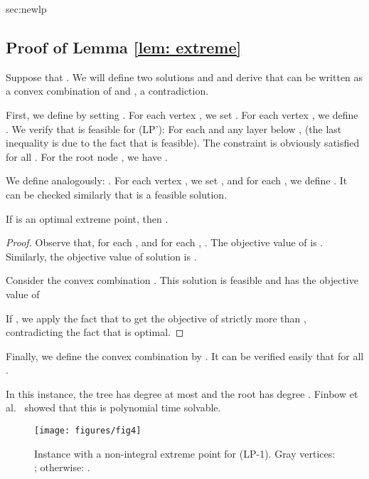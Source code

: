 \begin{appendixproof}{sec:newlp}{\subsection{Proof of Lemma \ref{lem: extreme}}}
Suppose that . 
We will define two solutions  and  and derive that  can be written as a convex combination of  and , a contradiction.

First, we define  by setting . For each vertex , we set . For each vertex , we define .
We verify that  is feasible for (LP'): For each  and any layer  below ,  (the last inequality is due to the fact that  is feasible).
The constraint is obviously satisfied for all .  
For the root node , we have .  

We define  analogously: . For each vertex , we set , and for each , we define . 
It can be checked similarly that  is a feasible solution.  

\begin{claim} 
If  is an optimal extreme point, then . 
\label{claim:extremepoint}
\end{claim} 

\begin{proof}Observe that, for each ,  and for each , .  
The objective value of  is .
Similarly, the objective value of solution  is .
 
Consider the convex combination . 
This solution is feasible and has the objective value of 

If , we apply the fact that  to get the objective of strictly more than , contradicting the fact that  is optimal.  
\end{proof} 

Finally, we define the convex combination by .
It can be verified easily that  for all .  
\end{appendixproof} 

\vspace{0.1in} 

 In this instance, the tree has degree at most  and the root has degree .  
Finbow et al.~\cite{FinbowG09} showed that this is polynomial time solvable. 

\begin{wrapfigure}[11]{r}{0.25\textwidth}
\centering
\texttt{[image: figures/fig4]}
\caption{Instance with a non-integral extreme point for (LP-1). Gray vertices: ; otherwise: .}
\label{fig:lp1badcase}
\end{wrapfigure}

